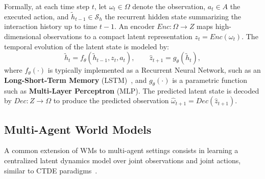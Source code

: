 \documentclass{article}
\theoremstyle{plain}
\theoremstyle{definition}
\theoremstyle{remark}
\begin{document}
Formally, at each time step $t$, let $\omega_t \in \Omega$ denote the observation,
$a_t \in A$ the executed action, and $\tilde{h}_{t-1} \in \mathcal{S}_h$ the recurrent hidden state summarizing the interaction history up to time $t-1$. An encoder $Enc : \Omega \rightarrow Z$ maps high-dimensional observations to a compact latent representation $z_t = Enc(\omega_t)$.
%
The temporal evolution of the latent state is modeled by:
\begin{equation}
  \tilde{h}_t = f_{\theta}(\tilde{h}_{t-1}, z_t, a_t), \qquad \hat{z}_{t+1} = g_{\theta}(\tilde{h}_t),
  \label{eq:wm_latent_update}
\end{equation}
where $f_{\theta}(\cdot)$ is typically implemented as a Recurrent Neural Network,
such as an \textbf{Long-Short-Term Memory} (LSTM)~\cite{hochreiter1997long},
and $g_{\theta}(\cdot)$ is a parametric function such as \textbf{Multi-Layer Perceptron} (MLP).
%
The predicted latent state is decoded by
$Dec : Z \rightarrow \Omega$ to produce the predicted observation
$\hat{\omega}_{t+1} = Dec(\hat{z}_{t+1})$.

\subsection{Multi-Agent World Models}
\label{sec:mawm_basics}

A common extension of WMs to multi-agent settings consists in learning a centralized latent dynamics model over joint observations and joint actions, similar to CTDE paradigms~\cite{Wang2022modelbasedmultiagentreinforcementlearning}.
\end{document}
